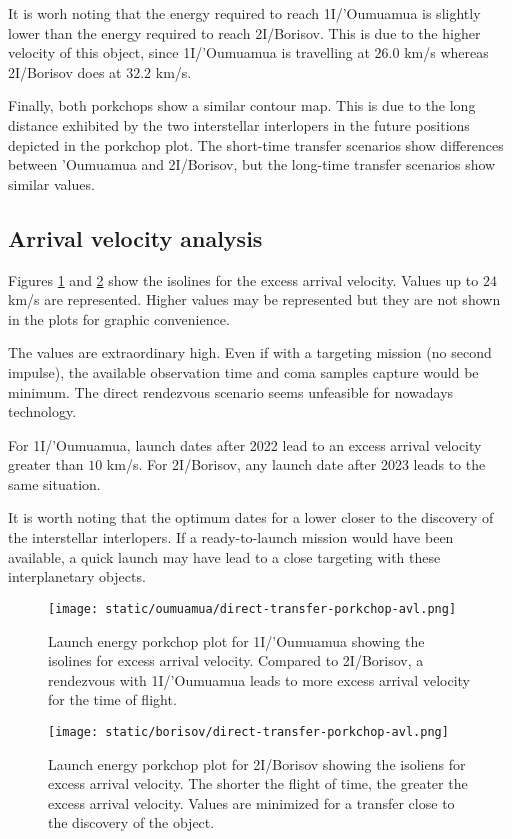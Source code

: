 It is worh noting that the energy required to reach 1I/'Oumuamua is slightly lower
than the energy required to reach 2I/Borisov. This is due to the higher velocity of
this object, since 1I/'Oumuamua is travelling at $26.0$ km/s whereas 2I/Borisov does
at $32.2$ km/s.

Finally, both porkchops show a similar contour map. This is due to the long
distance exhibited by the two interstellar interlopers in the future positions depicted in
the porkchop plot. The short-time transfer scenarios show differences between
'Oumuamua and 2I/Borisov, but the long-time transfer scenarios show similar values.

\subsection{Arrival velocity analysis}

Figures \ref{fig:oumuamua-direct-transfer-porkchop-avl} and
\ref{fig:borisov-direct-transfer-porkchop-avl} show the isolines for the excess
arrival velocity. Values up to $24$ km/s are represented. Higher values may be
represented but they are not shown in the plots for graphic convenience.

The values are extraordinary high. Even if with a targeting mission (no second
impulse), the available observation time and coma samples capture would be
minimum. The direct rendezvous scenario seems unfeasible for nowadays
technology.

For 1I/'Oumuamua, launch dates after 2022 lead to an excess arrival velocity
greater than $10$ km/s. For 2I/Borisov, any launch date after 2023 leads to the same
situation.

It is worth noting that the optimum dates for a lower closer to the discovery of
the interstellar interlopers. If a ready-to-launch mission would have been available, a quick
launch may have lead to a close targeting with these interplanetary objects.

\newpage
\begin{figure}[H]
  \centering
  \texttt{[image: static/oumuamua/direct-transfer-porkchop-avl.png]}
  \caption{Launch energy porkchop plot for 1I/'Oumuamua showing the isolines for
    excess arrival velocity. Compared to 2I/Borisov, a rendezvous with
    1I/'Oumuamua leads to more excess arrival velocity for the time of flight.}
  \label{fig:oumuamua-direct-transfer-porkchop-avl}
\end{figure}
\begin{figure}[H]
  \centering
  \texttt{[image: static/borisov/direct-transfer-porkchop-avl.png]}
  \caption{Launch energy porkchop plot for 2I/Borisov showing the isoliens for
    excess arrival velocity. The shorter the flight of time, the greater the
    excess arrival velocity. Values are minimized for a transfer close to
    the discovery of the object.}
  \label{fig:borisov-direct-transfer-porkchop-avl}
\end{figure}
\newpage

